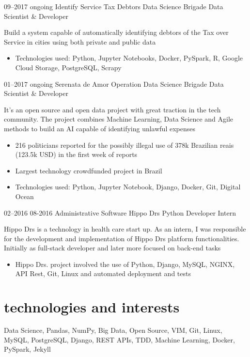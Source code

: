 \documentclass[]{friggeri-cv}
\begin{document}
\begin{entrylist}
  \entrysecondtype
    {09–2017 ongoing}
    {Identify Service Tax Debtors}
    {Data Science Brigade}
    {Data Scientist \& Developer}
    {Build a system capable of automatically identifying debtors of the Tax over Service in cities using both private and public data
      \begin{itemize}
        \item Technologies used: Python, Jupyter Notebooks, Docker, PySpark, R, Google Cloud Storage, PostgreSQL, Scrapy
      \end{itemize}
    }
  \entrysecondtype
    {01–2017 ongoing}
    {Serenata de Amor Operation}
    {Data Science Brigade}
    {Data Scientist \& Developer}
    {It's an open source and open data project with great traction in the tech community. The project combines Machine Learning, Data Science and Agile methods to build an AI capable of identifying unlawful expenses
      \begin{itemize}
        \item 216 politicians reported for the possibly illegal use of 378k Brazilian reais (123.5k USD) in the first week of reports
        \item Largest technology crowdfunded project in Brazil
        \item Technologies used: Python, Jupyter Notebook, Django, Docker, Git, Digital Ocean
      \end{itemize}
    }
  \entrysecondtype
    {02–2016 08-2016}
    {Administrative Software}
    {Hippo Drs}
    {Python Developer Intern}
    {Hippo Drs is a technology in health care start up. As an intern, I was responsible for the development and implementation of Hippo Drs platform functionalities. Initially as full-stack developer and later more focused on back-end tasks
      \begin{itemize}
        \item Hippo Drs. project involved the use of Python, Django, MySQL, NGINX, API Rest, Git, Linux and automated deployment and tests
      \end{itemize}
    }
\end{entrylist}

\section{technologies and interests}

\small Data Science, Pandas, NumPy, Big Data, Open Source, VIM, Git, Linux, MySQL, PostgreSQL, Django, REST APIs, TDD, Machine Learning, Docker, PySpark, Jekyll
\end{document}
